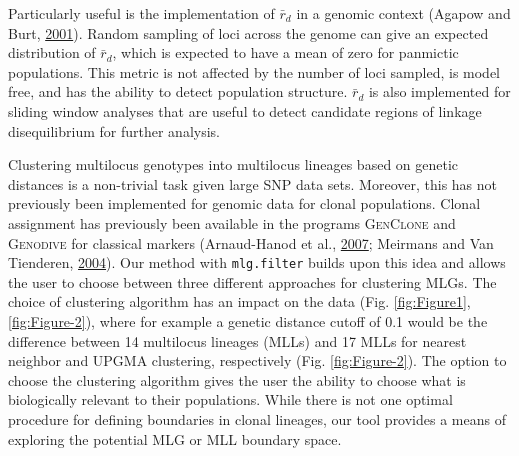 \documentclass[double,12pt]{beavtex}
\begin{document}
  Particularly useful is the implementation of \(\bar{r}_d\) in a genomic
  context (Agapow and Burt, \protect\hyperlink{ref-Agapowux5f2001}{2001}).
  Random sampling of loci across the genome can give an expected
  distribution of \(\bar{r}_d\), which is expected to have a mean of zero
  for panmictic populations. This metric is not affected by the number of
  loci sampled, is model free, and has the ability to detect population
  structure. \(\bar{r}_d\) is also implemented for sliding window analyses
  that are useful to detect candidate regions of linkage disequilibrium
  for further analysis.
  
  Clustering multilocus genotypes into multilocus lineages based on
  genetic distances is a non-trivial task given large SNP data sets.
  Moreover, this has not previously been implemented for genomic data for
  clonal populations. Clonal assignment has previously been available in
  the programs \textsc{GenClone} and \textsc{Genodive} for classical
  markers (Arnaud-Hanod et al.,
  \protect\hyperlink{ref-arnaud2007standardizing}{2007}; Meirmans and Van
  Tienderen, \protect\hyperlink{ref-meirmans2004genotype}{2004}). Our
  method with \texttt{mlg.filter} builds upon this idea and allows the
  user to choose between three different approaches for clustering MLGs.
  The choice of clustering algorithm has an impact on the data (Fig.
  \ref{fig:Figure1}, \ref{fig:Figure-2}), where for example a genetic
  distance cutoff of 0.1 would be the difference between 14 multilocus
  lineages (MLLs) and 17 MLLs for nearest neighbor and UPGMA clustering,
  respectively (Fig. \ref{fig:Figure-2}). The option to choose the
  clustering algorithm gives the user the ability to choose what is
  biologically relevant to their populations. While there is not one
  optimal procedure for defining boundaries in clonal lineages, our tool
  provides a means of exploring the potential MLG or MLL boundary space.
  
\end{document}
